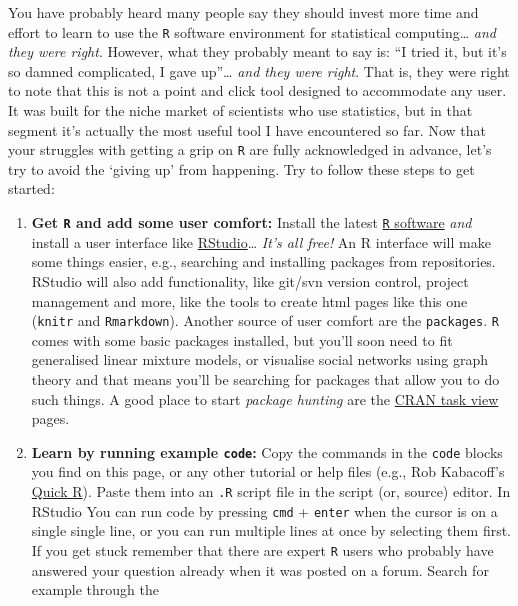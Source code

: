 \documentclass[]{book}
\begin{document}
You have probably heard many people say they should invest more time and
effort to learn to use the \texttt{R} software environment for
statistical computing\ldots{} \emph{and they were right}. However, what
they probably meant to say is: ``I tried it, but it's so damned
complicated, I gave up''\ldots{} \emph{and they were right}. That is,
they were right to note that this is not a point and click tool designed
to accommodate any user. It was built for the niche market of scientists
who use statistics, but in that segment it's actually the most useful
tool I have encountered so far. Now that your struggles with getting a
grip on \texttt{R} are fully acknowledged in advance, let's try to avoid
the `giving up' from happening. Try to follow these steps to get
started:

\begin{enumerate}
\def\labelenumi{\arabic{enumi}.}
\item
  \textbf{Get \texttt{R} and add some user comfort:} Install the latest
  \href{http://www.r-project.org}{\texttt{R} software} \emph{and}
  install a user interface like
  \href{http://www.rstudio.com}{RStudio}\ldots{} \emph{It's all free!}
  An R interface will make some things easier, e.g., searching and
  installing packages from repositories. RStudio will also add
  functionality, like git/svn version control, project management and
  more, like the tools to create html pages like this one
  (\texttt{knitr} and \texttt{Rmarkdown}). Another source of user
  comfort are the \texttt{packages}. \texttt{R} comes with some basic
  packages installed, but you'll soon need to fit generalised linear
  mixture models, or visualise social networks using graph theory and
  that means you'll be searching for packages that allow you to do such
  things. A good place to start \emph{package hunting} are the
  \href{http://cran.r-project.org/web/views/}{CRAN task view} pages.
\item
  \textbf{Learn by running example \texttt{code}:} Copy the commands in
  the \texttt{code} blocks you find on this page, or any other tutorial
  or help files (e.g., Rob Kabacoff's
  \href{http://www.statmethods.net}{Quick R}). Paste them into an
  \texttt{.R} script file in the script (or, source) editor. In RStudio
  You can run code by pressing \texttt{cmd} + \texttt{enter} when the
  cursor is on a single single line, or you can run multiple lines at
  once by selecting them first. If you get stuck remember that there are
  expert \texttt{R} users who probably have answered your question
  already when it was posted on a forum. Search for example through the

\end{enumerate}
\end{document}
